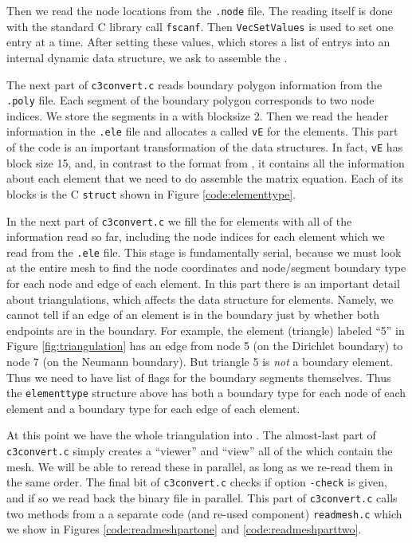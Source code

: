 Then we read the node locations from the \texttt{.node} file.  The reading itself is done with the standard C library call \texttt{fscanf}.  Then \texttt{VecSetValues} is used to set one entry at a time.  After setting these values, which stores a list of entrys into an internal \PETSc dynamic data structure, we ask \PETSc to assemble the \pVecs.

The next part of \texttt{c3convert.c} reads boundary polygon information from the \texttt{.poly} file.  Each segment of the boundary polygon corresponds to two node indices.  We store the segments in a \pVec with blocksize 2.  Then we read the header information in the \texttt{.ele} file and allocates a \pVec called \texttt{vE} for the elements.  This part of the code is an important transformation of the data structures.  In fact, \texttt{vE} has block size 15, and, in contrast to the format from \Triangle, it contains all the information about each element that we need to do assemble the matrix equation.  Each of its blocks is the C \texttt{struct} shown in Figure \ref{code:elementtype}.


In the next part of \texttt{c3convert.c} we fill the \pVec for elements with all of the information read so far, including the node indices for each element which we read from the \texttt{.ele} file.  This stage is fundamentally serial, because we must look at the entire mesh to find the node coordinates and node/segment boundary type for each node and edge of each element.  In this part there is an important detail about triangulations, which affects the data structure for elements.  Namely, we cannot tell if an edge of an element is in the boundary just by whether both endpoints are in the boundary.  For example, the element (triangle) labeled ``5'' in Figure \ref{fig:triangulation} has an edge from node 5 (on the Dirichlet boundary) to node 7 (on the Neumann boundary).  But triangle 5 is \emph{not} a boundary element.  Thus we need to have list of flags for the boundary segments themselves.  Thus the \texttt{elementtype} structure above has both a boundary type for each node of each element and a boundary type for each edge of each element.

At this point we have the whole triangulation into \PETSc \pVecs.  The almost-last part of \texttt{c3convert.c} simply creates a \PETSc ``viewer'' and ``view'' all of the \pVecs which contain the mesh.  We will be able to reread these \pVecs in parallel, as long as we re-read them in the same order.  The final bit of \texttt{c3convert.c} checks if option \texttt{-check} is given, and if so we read back the binary file in parallel.  This part of \texttt{c3convert.c} calls two methods from a a separate code (and re-used component) \texttt{readmesh.c} which we show in Figures \ref{code:readmeshpartone} and \ref{code:readmeshparttwo}.

